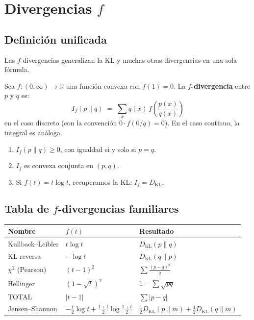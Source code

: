 \section{Divergencias $f$}

\subsection{Definición unificada}

Las $f$-divergencias generalizan la KL y muchas otras divergencias en una sola fórmula.

\begin{definition}
	Sea $f: (0,\infty) \to \mathbb{R}$ una función convexa con $f(1) = 0$.  La \textbf{$f$-divergencia} entre $p$ y $q$ es:
	\[
	I_f(p \| q) \;=\; \sum_x q(x) \, f\!\left(\frac{p(x)}{q(x)}\right)
	\]
	en el caso discreto (con la convención $0 \cdot f(0/q) = 0$).  En el caso continuo, la integral es análoga.
\end{definition}

\begin{theorem}
	\begin{enumerate}
		\item $I_f(p \| q) \ge 0$, con igualdad si y solo si $p = q$.
		\item $I_f$ es convexa conjunta en $(p, q)$.
		\item Si $f(t) = t \log t$, recuperamos la KL: $I_f = D_{\mathrm{KL}}$.
	\end{enumerate}
\end{theorem}

\subsection{Tabla de $f$-divergencias familiares}

\begin{center}
	\renewcommand{\arraystretch}{1.4}
	\setlength{\tabcolsep}{8pt}
	\begin{tabular}{|l|l|l|}
		\hline
		\rowcolor{Accent!20}
		\textbf{Nombre} & \textbf{$f(t)$} & \textbf{Resultado} \\
		\hline
		Kullback--Leibler & $t \log t$ & $D_{\mathrm{KL}}(p \| q)$ \\
		\hline
		KL reversa & $-\log t$ & $D_{\mathrm{KL}}(q \| p)$ \\
		\hline
		$\chi^2$ (Pearson) & $(t-1)^2$ & $\sum \frac{(p-q)^2}{q}$ \\
		\hline
		Hellinger & $(1-\sqrt{t})^2$ & $1 - \sum \sqrt{pq}$ \\
		\hline
		TOTAL & $|t-1|$ & $\sum |p-q|$ \\
		\hline
		Jensen--Shannon & $-\frac{t}{2}\log t + \frac{1+t}{2}\log\frac{1+t}{2}$ & $\frac{1}{2}D_{\mathrm{KL}}(p \| m) + \frac{1}{2}D_{\mathrm{KL}}(q \| m)$ \\
		\hline
	\end{tabular}
\end{center}

